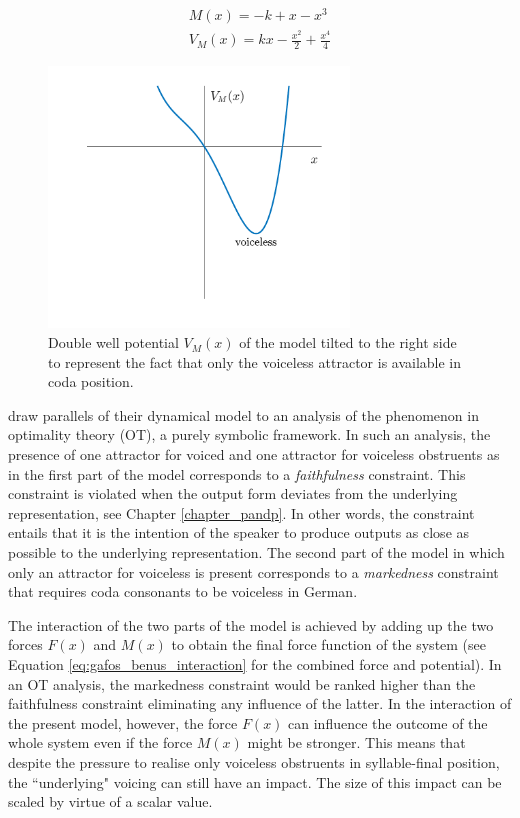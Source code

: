 \begin{equation}
\begin{split}
M(x) = -k+x-x^3\\
V_M(x) = kx - \frac{x^2}{2} + \frac{x^4}{4}
\end{split}
\label{eq:gafos_benus_coda_force_potential}
\end{equation}

\begin{figure}
\includegraphics[width=8cm]{figures/ch3/gafos_benus_coda_potential.pdf}
\caption[Tilted double well potential $V_M(x)$ of the \citet{GafosBenus2006} model.]{Double well potential $V_M(x)$ of the \citet{GafosBenus2006} model tilted to the right side to represent the fact that only the voiceless attractor is available in coda position.}
\label{fig:gafos_benus_coda_potential}
\end{figure}

\citet{GafosBenus2006} draw parallels of their dynamical model to an analysis of the phenomenon in optimality theory (OT), a purely symbolic framework. In such an analysis, the presence of one attractor for voiced and one attractor for voiceless obstruents as in the first part of the model corresponds to a \emph{faithfulness} constraint. This constraint is violated when the output form deviates from the underlying representation, see Chapter \ref{chapter_pandp}. In other words, the constraint entails that it is the intention of the speaker to produce outputs as close as possible to the underlying representation. The second part of the model in which only an attractor for voiceless is present corresponds to a \emph{markedness} constraint that requires coda consonants to be voiceless in German.

The interaction of the two parts of the model is achieved by adding up the two forces $F(x)$ and $M(x)$ to obtain the final force function of the system (see Equation \ref{eq:gafos_benus_interaction} for the combined force and potential). In an OT analysis, the markedness constraint would be ranked higher than the faithfulness constraint eliminating any influence of the latter. In the interaction of the present model, however, the force $F(x)$ can influence the outcome of the whole system even if the force $M(x)$ might be stronger. This means that despite the pressure to realise only voiceless obstruents in syllable-final position, the ``underlying" voicing can still have an impact. The size of this impact can be scaled by virtue of a scalar value.

